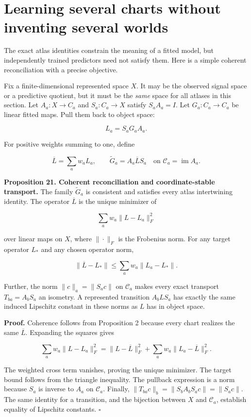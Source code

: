 \section{Learning several charts without inventing several worlds}\label{LSM:learning-several-charts-without-inventing-several-worlds}

The exact atlas identities constrain the meaning of a fitted model, but
independently trained predictors need not satisfy them. Here is a simple
coherent reconciliation with a precise objective.

Fix a finite-dimensional represented space \(X\). It may be the observed
signal space or a predictive quotient, but it must be the \emph{same}
space for all atlases in this section. Let \(A_a:X\to C_a\) and
\(S_a:C_a\to X\) satisfy \(S_aA_a=I\). Let \(G_a:C_a\to C_a\) be linear
fitted maps. Pull them back to object space:

\[
L_a=S_aG_aA_a.
\]

For positive weights summing to one, define

\[
\overline L=\sum_aw_aL_a,
\qquad\widetilde G_a=A_a\overline LS_a
\quad\text{on }\mathcal C_a=\operatorname{im}A_a.
\]

\textbf{Proposition 21. Coherent reconciliation and coordinate-stable
transport.} The family \(\widetilde G_a\) is consistent and satisfies
every atlas intertwining identity. The operator \(\overline L\) is the
unique minimizer of

\[
\sum_aw_a\|L-L_a\|_F^2
\]

over linear maps on \(X\), where \(\|\cdot\|_F\) is the Frobenius norm.
For any target operator \(L_*\) and any chosen operator norm,

\[
\|\overline L-L_*\|\leq\sum_aw_a\|L_a-L_*\|.
\]

Further, the norm \(\|c\|_a=\|S_ac\|\) on \(\mathcal C_a\) makes every
exact transport \(T_{ba}=A_bS_a\) an isometry. A represented transition
\(A_bLS_a\) has exactly the same induced Lipschitz constant in these
norms as \(L\) has in object space.

\textbf{Proof.} Coherence follows from Proposition 2 because every chart
realizes the same \(\overline L\). Expanding the squares gives

\[
\sum_aw_a\|L-L_a\|_F^2
=\|L-\overline L\|_F^2+
\sum_aw_a\|L_a-\overline L\|_F^2.
\]

The weighted cross term vanishes, proving the unique minimizer. The
target bound follows from the triangle inequality. The pullback
expression is a norm because \(S_a\) is inverse to \(A_a\) on
\(\mathcal C_a\). Finally, \(\|T_{ba}c\|_b=\|S_bA_bS_ac\|=\|S_ac\|\).
The same identity for a transition, and the bijection between \(X\) and
\(\mathcal C_a\), establish equality of Lipschitz constants. \(\square\)

